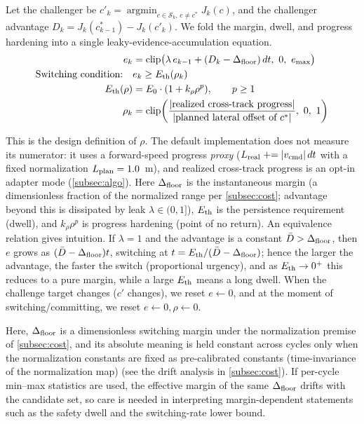 Let the challenger be $c'_k = \operatorname*{argmin}_{c \in \mathcal{S}_k,\, c \ne c^*} J_k(c)$, and the challenger advantage $D_k = J_k(c^*_{k-1}) - J_k(c'_k)$. We fold the margin, dwell, and progress hardening into a single leaky-evidence-accumulation equation.
\begin{align}
e_k &= \mathrm{clip}\big(\lambda\, e_{k-1} + (D_k - \Dfloor)\, dt,\ 0,\ e_{\max}\big) \label{eq:accum}\\
\text{Switching condition:}\quad & e_k \ge \Eth(\rho_k) \\
\Eth(\rho) &= E_0 \cdot (1 + k_\rho \rho^p), \qquad p \ge 1 \label{eq:eth}\\
\rho_k &= \mathrm{clip}\!\left(\frac{|\text{realized cross-track progress}|}{|\text{planned lateral offset of } c^*|},\ 0,\ 1\right)
\end{align}

This is the design definition of $\rho$. The default implementation does not measure its numerator: it uses a forward-speed progress \emph{proxy} ($L_{\rm real}\mathrel{+}=|v_{\rm cmd}|\,dt$ with a fixed normalization $L_{\rm plan}=1.0$~m), and realized cross-track progress is an opt-in adapter mode (\cref{subsec:algo}). Here $\Delta_{\text{floor}}$ is the instantaneous margin (a dimensionless fraction of the normalized range per \cref{subsec:cost}; advantage beyond this is dissipated by leak $\lambda \in (0,1]$), $E_{\text{th}}$ is the persistence requirement (dwell), and $k_\rho \rho^p$ is progress hardening (point of no return). An equivalence relation gives intuition. If $\lambda = 1$ and the advantage is a constant $\bar D > \Delta_{\text{floor}}$, then $e$ grows as $(\bar D - \Delta_{\text{floor}})t$, switching at $t = E_{\text{th}}/(\bar D - \Delta_{\text{floor}})$; hence the larger the advantage, the faster the switch (proportional urgency), and as $E_{\text{th}} \to 0^+$ this reduces to a pure margin, while a large $E_{\text{th}}$ means a long dwell. When the challenge target changes ($c'$ changes), we reset $e \leftarrow 0$, and at the moment of switching/committing, we reset $e \leftarrow 0, \rho \leftarrow 0$.

Here, $\Delta_{\text{floor}}$ is a dimensionless switching margin under the normalization premise of \cref{subsec:cost}, and its absolute meaning is held constant across cycles only when the normalization constants are fixed as pre-calibrated constants (time-invariance of the normalization map) (see the drift analysis in \cref{subsec:cost}). If per-cycle min--max statistics are used, the effective margin of the same $\Delta_{\text{floor}}$ drifts with the candidate set, so care is needed in interpreting margin-dependent statements such as the safety dwell and the switching-rate lower bound.

